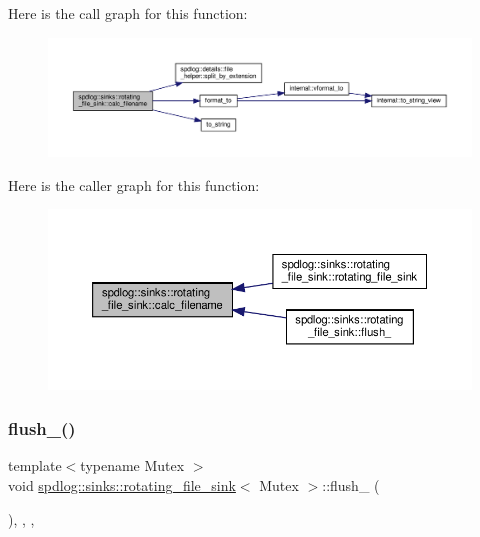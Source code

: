 Here is the call graph for this function\+:
\nopagebreak
\begin{figure}[H]
\begin{center}
\leavevmode
\includegraphics[width=350pt]{classspdlog_1_1sinks_1_1rotating__file__sink_a05d77d7013bc54f55cac702c122ac1c9_cgraph}
\end{center}
\end{figure}
Here is the caller graph for this function\+:
\nopagebreak
\begin{figure}[H]
\begin{center}
\leavevmode
\includegraphics[width=350pt]{classspdlog_1_1sinks_1_1rotating__file__sink_a05d77d7013bc54f55cac702c122ac1c9_icgraph}
\end{center}
\end{figure}
\mbox{\label{classspdlog_1_1sinks_1_1rotating__file__sink_ae93e4792b76f73bb0be8e50b5c5e889b}} 
\subsubsection{\texorpdfstring{flush\+\_\+()}{flush\_()}}
{\footnotesize\ttfamily template$<$typename Mutex $>$ \\
void \hyperlink{classspdlog_1_1sinks_1_1rotating__file__sink}{spdlog\+::sinks\+::rotating\+\_\+file\+\_\+sink}$<$ Mutex $>$\+::flush\+\_\+ (\begin{DoxyParamCaption}{ }\end{DoxyParamCaption})\hspace{0.3cm}{\ttfamily [inline]}, {\ttfamily [override]}, {\ttfamily [protected]}, {\ttfamily [virtual]}}




